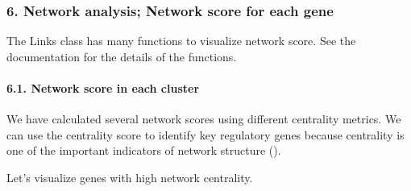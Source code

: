 \documentclass[letterpaper,10pt,english]{sphinxmanual}
\begin{document}
\subsubsection{6. Network analysis; Network score for each gene}
\label{\detokenize{notebooks/04_Network_analysis/Network_analysis_with_with_Paul_etal_2015_data:6.-Network-analysis;-Network-score-for-each-gene}}
The Links class has many functions to visualize network score. See the documentation for the details of the functions.


\paragraph{6.1. Network score in each cluster}
\label{\detokenize{notebooks/04_Network_analysis/Network_analysis_with_with_Paul_etal_2015_data:6.1.-Network-score-in-each-cluster}}
We have calculated several network scores using different centrality metrics. We can use the centrality score to identify key regulatory genes because centrality is one of the important indicators of network structure ().

Let’s visualize genes with high network centrality.

{
\begin{sphinxVerbatim}[commandchars=\\\{\}]
\llap{\color{nbsphinxin}[ ]:\,\hspace{\fboxrule}\hspace{\fboxsep}}
\end{sphinxVerbatim}
}

{
\begin{sphinxVerbatim}[commandchars=\\\{\}]
\llap{\color{nbsphinxin}[53]:\,\hspace{\fboxrule}\hspace{\fboxsep}}
  
\end{sphinxVerbatim}
}
\end{document}
